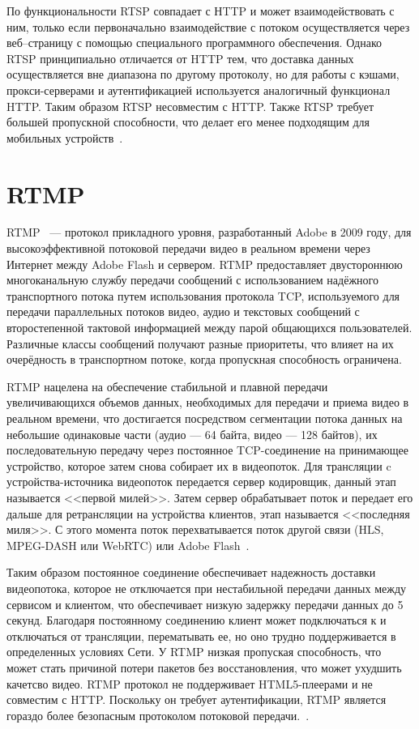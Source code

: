 По функциональности RTSP совпадает с НTTP и может взаимодействовать с ним, только если первоначально взаимодействие с потоком осуществляется через веб--страницу с помощью специального программного обеспечения.
Однако RTSP принципиально отличается от HTTP тем, что доставка данных осуществляется вне диапазона по другому протоколу, но для работы с кэшами, прокси-серверами и аутентификацией используется аналогичный  функционал HTTP. Таким образом RTSP несовместим с HTTP. Также RTSP  требует большей пропускной способности, что делает его менее подходящим для мобильных устройств~\cite{rfc_rtsp, rfc_http_auth}.

\section{RTMP}

RTMP~\cite{rtmp_adobe} --- протокол прикладного уровня, разработанный Adobe в 2009 году, для высокоэффективной потоковой передачи видео в реальном времени через Интернет между Adobe Flash и сервером.
RTMP предоставляет двустороннюю многоканальную службу передачи сообщений с использованием надёжного транспортного потока путем использования протокола TCP, используемого для передачи параллельных потоков видео, аудио и текстовых сообщений с второстепенной тактовой информацией между парой общающихся пользователей.
Различные классы сообщений получают разные приоритеты, что влияет на их очерёдность в транспортном потоке, когда пропускная способность ограничена.

RTMP нацелена на обеспечение стабильной и плавной передачи увеличивающихся объемов данных, необходимых для передачи и приема видео в реальном времени, что достигается посредством сегментации потока данных на небольшие одинаковые части (аудио --- 64 байта, видео --- 128 байтов), их последовательную передачу через постоянное TCP-соединение на принимающее устройство, которое затем снова собирает их в видеопоток. 
Для трансляции c устройства-источника  видеопоток передается сервер кодировщик, данный этап называется <<первой милей>>. 
Затем сервер обрабатывает поток и передает его дальше для ретрансляции на устройства клиентов, этап называется <<последняя миля>>.
С этого момента поток перехватывается поток другой связи (HLS, MPEG-DASH или WebRTC) или Adobe Flash~\cite{rtmp_adobe}.

Таким образом постоянное соединение обеспечивает надежность доставки видеопотока, которое не отключается при нестабильной передачи данных между сервисом и клиентом, что обеспечивает низкую задержку передачи данных до 5 секунд. 
Благодаря постоянному соединению клиент может подключаться к и отключаться от трансляции, перематывать ее, но оно трудно поддерживается в определенных условиях Сети.
У RTMP низкая пропуская способность, что может стать причиной потери пакетов без восстановления, что может ухудшить качетсво видео.
RTMP протокол не поддерживает HTML5-плеерами и не совместим с HTTP. Поскольку он требует аутентификации, RTMP является гораздо более безопасным протоколом потоковой передачи.~\cite{rtmp_adobe}.

